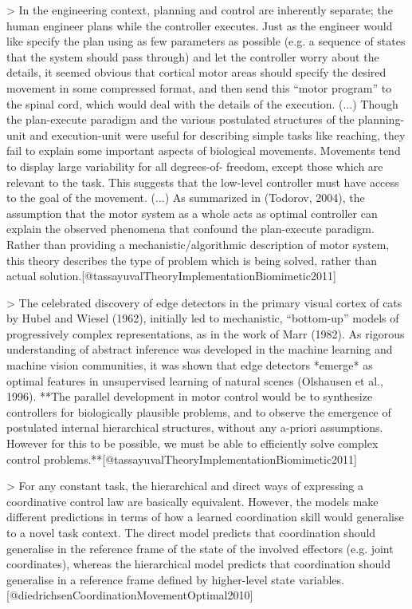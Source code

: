 \documentclass[../main.tex]{subfiles}
\begin{document}
{{> In the engineering context, planning and control are inherently separate; the human engineer plans while the controller executes. Just as the engineer would like specify the plan using as few parameters as possible (e.g. a sequence of states that the system should pass through) and let the controller worry about the details, it seemed obvious that cortical motor areas should specify the desired movement in some compressed format, and then send this “motor program” to the spinal cord, which would deal with the details of the execution. (...) Though the plan-execute paradigm and the various postulated structures of the planning-unit and execution-unit were useful for describing simple tasks like reaching, they fail to explain some important aspects of biological movements. Movements tend to display large variability for all degrees-of- freedom, except those which are relevant to the task. This suggests that the low-level controller must have access to the goal of the movement. (...) As summarized in (Todorov, 2004), the assumption that the motor system as a whole acts as optimal controller can explain the observed phenomena that confound the plan-execute paradigm. Rather than providing a mechanistic/algorithmic description of motor system, this theory describes the type of problem which is being solved, rather than actual solution.[@tassayuvalTheoryImplementationBiomimetic2011]



> The celebrated discovery of edge detectors in the primary visual cortex of cats by Hubel and Wiesel (1962), initially led to mechanistic, “bottom-up” models of progressively complex representations, as in the work of Marr (1982). As rigorous understanding of abstract inference was developed in the machine learning and machine vision communities, it was shown that edge detectors *emerge* as optimal features in unsupervised learning of natural scenes (Olshausen et al., 1996). **The parallel development in motor control would be to synthesize controllers for biologically plausible problems, and to observe the emergence of postulated internal hierarchical structures, without any a-priori assumptions. However for this to be possible, we must be able to efficiently solve complex control problems.**[@tassayuvalTheoryImplementationBiomimetic2011]



> For any constant task, the hierarchical and direct ways of expressing a coordinative control law are basically equivalent. However, the models make different predictions in terms of how a learned coordination skill would generalise to a novel task context. The direct model predicts that coordination should generalise in the reference frame of the state of the involved effectors (e.g. joint coordinates), whereas the hierarchical model predicts that coordination should generalise in a reference frame defined by higher-level state variables.[@diedrichsenCoordinationMovementOptimal2010]



}}
\end{document}
